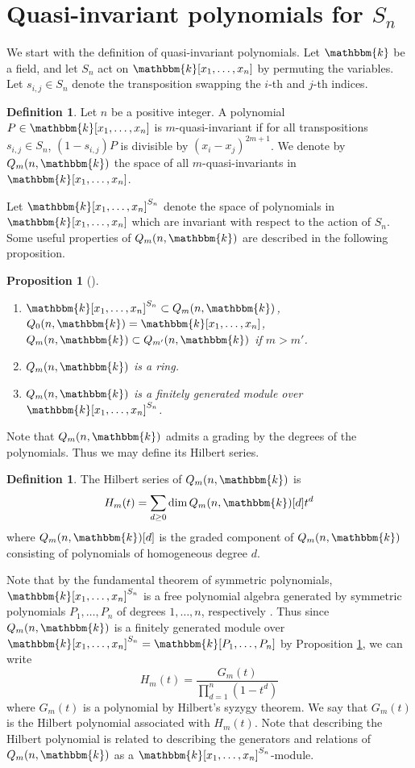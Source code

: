 \documentclass[11pt]{article}
\newtheorem{proposition}[theorem]{Proposition}
\theoremstyle{definition}
\newtheorem{definition}[theorem]{Definition}
\renewcommand{\k}{\mathbbm{k}}
\begin{document}
\section{Quasi-invariant polynomials for $S_n$}\label{sec:2}

We start with the definition of quasi-invariant polynomials. Let $\k$ be a field, and let $S_n$ act on $\k[x_1,\dots,x_n]$ by permuting the variables. Let $s_{i,j}\in S_n$ denote the transposition swapping the $i$-th and $j$-th indices.

\begin{definition}
    Let $n$ be a positive integer. A polynomial $P\in\k[x_1,\dots,x_n]$ is $m$-quasi-invariant if for all transpositions $s_{i,j}\in S_n$, $(1-s_{i,j})P$ is divisible by $(x_i-x_j)^{2m+1}$. We denote by $Q_m(n,\k)$ the space of all $m$-quasi-invariants in $\k[x_1,\dots,x_n]$. 
\end{definition}

Let $\k[x_1,\dots,x_n]^{S_n}$ denote the space of polynomials in $\k[x_1,\dots,x_n]$ which are invariant with respect to the action of $S_n$. Some useful properties of $Q_m(n,\k)$ are described in the following proposition. 

\begin{proposition}[\cite{etingof2002lectures}]\label{prop:2.2}
    \phantom{.}

    \begin{enumerate}
        \item $\k[x_1,\dots,x_n]^{S_n}\subset Q_m(n,\k)$, $Q_0(n,\k)=\k[x_1,\dots,x_n]$, $Q_m(n,\k)\subset Q_{m'}(n,\k)$ if $m>m'$.
        \item $Q_m(n,\k)$ is a ring.
        \item $Q_m(n,\k)$ is a finitely generated module over $\k[x_1,\dots,x_n]^{S_n}$.
    \end{enumerate}
\end{proposition}

Note that $Q_m(n,\k)$ admits a grading by the degrees of the polynomials. Thus we may define its Hilbert series.

\begin{definition}
    The Hilbert series of $Q_m(n,\k)$ is
    $$H_m(t)=\sum_{d\geq 0}\dim Q_m(n,\k)[d]t^d$$
    where $Q_m(n,\k)[d]$ is the graded component of $Q_m(n,\k)$ consisting of polynomials of homogeneous degree $d$.
\end{definition}

Note that by the fundamental theorem of symmetric polynomials, $\k[x_1,\dots,x_n]^{S_n}$ is a free polynomial algebra generated by symmetric polynomials $P_1,\dots,P_n$ of degrees $1,\dots,n$, respectively \cite{humphreys_1990}. Thus since $Q_m(n,\k)$ is a finitely generated module over $\k[x_1,\dots,x_n]^{S_n}=\k[P_1,\dots,P_n]$ by Proposition \ref{prop:2.2}, we can write
$$H_m(t)=\frac{G_m(t)}{\prod_{d=1}^n(1-t^d)}$$
where $G_m(t)$ is a polynomial by Hilbert's syzygy theorem. We say that $G_m(t)$ is the Hilbert polynomial associated with $H_m(t)$. Note that describing the Hilbert polynomial is related to describing the generators and relations of $Q_m(n,\k)$ as a $\k[x_1,\dots,x_n]^{S_n}$-module.
\end{document}

